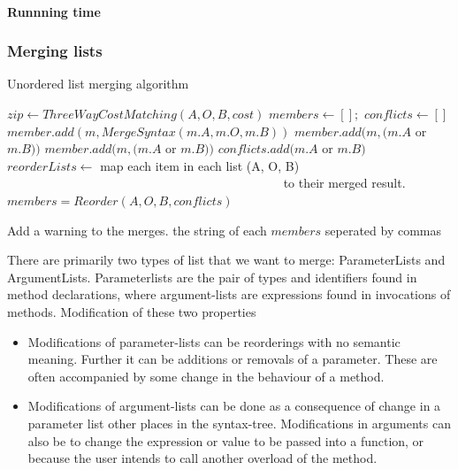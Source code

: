 \documentclass[11pt]{article}
\begin{document}

\paragraph{Runnning time} 

\subsubsection{Merging lists}
\begin{algorithm}
  \caption{Unordered list merging algorithm}
  \label{Listmerger}
\begin{algorithmic}
    \State $zip \gets ThreeWayCostMatching(A, O, B, cost)$
    \State $members \gets [];$
   	\State $conflicts \gets []$
           \State $member.add(m, MergeSyntax(m.A, m.O, m.B))$
			\State $member.add(m, (m.A$ or $m.B ))$
			\State $member.add(m, (m.A$ or $m.B ))$
			\State $conflicts.add(m.A$ or $m.B )$
		\EndIf
		\State $reorderLists \gets $ map each item in each list (A, O, B)
		\State ~~~~~~~~~~~~~~~~~~~~~~~~~~~~~~~~~~~~~~~~~~~~ to their merged result.
		\State $members = Reorder(A, O, B, conflicts)$
	\EndFor

        \State Add a warning to the merges.
    \EndFor
	\State \Return the string of each $members$ seperated by commas
\EndFunction
\end{algorithmic}
\end{algorithm}


There are primarily two types of list that we want to merge: ParameterLists and ArgumentLists. Parameterlists are the pair of types and identifiers found in method declarations, where argument-lists are expressions found in invocations of methods. Modification of these two properties 

\begin{itemize}
   \item Modifications of parameter-lists can be reorderings with no semantic meaning. Further it can be additions or removals of a parameter. These are often accompanied by some change in the behaviour of a method.
   \item Modifications of argument-lists can be done as a consequence of change in a parameter list other places in the syntax-tree. Modifications in arguments can also be to change the expression or value to be passed into a function, or because the user intends to call another overload of the method.
\end{itemize}
\end{document}
